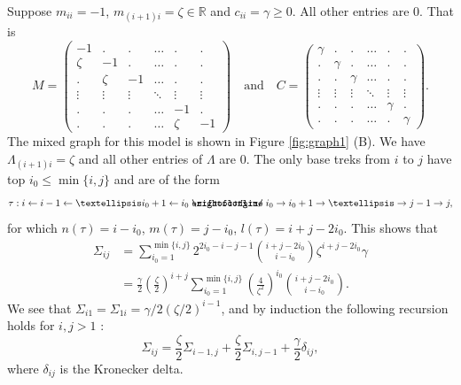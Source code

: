 \documentclass[10pt,twoside,a4paper]{amsart}
\DeclareRobustCommand{\unEdge}{%
	\mathrel{%
		\text{%
			\ooalign{$\rightfootline$\cr\reflectbox{$\rightfootline$}\cr}%
		}%
	}%
}
\begin{document}
\begin{ex} \label{ex:path}
    Suppose $m_{ii} = -1$, $m_{(i+1)i} = \zeta \in \mathbb{R}$ and $c_{ii} = \gamma \geq 0$. 
    All other entries are 0.
    That is
    \[
    M = \left( \begin{array}{ccccccc} 
        -1 & . & . & \ldots & . & . \\
        \zeta & -1 & . & \ldots & . & . \\
        . & \zeta & -1 & \ldots & . & . \\
        \vdots & \vdots & \vdots & \ddots & \vdots & \vdots \\
        . & . & . & \ldots & -1 & . \\        
        . & . & . & \ldots & \zeta & -1        
    \end{array}\right) \quad \text{and} \quad
    C = \left( \begin{array}{ccccccc} 
        \gamma & . & . & \ldots & . & . \\
        . & \gamma & . & \ldots & . & .\\
        . & . & \gamma & \ldots & . & . \\
        \vdots & \vdots & \vdots & \ddots  & \vdots & \vdots \\
        . & . & . & \ldots & \gamma & . \\
        . & . & . & \ldots & . & \gamma
    \end{array}\right).
    \]
    The mixed graph for this model is shown in Figure \ref{fig:graph1} (B).
    We have $\Lambda_{(i+1)i} = \zeta$ and all 
    other entries of $\Lambda$ are 0. The only base treks 
    from $i$ to $j$ have top $i_0 \leq \min\{i,j\}$ and are of the form
    $$\tau: i \leftarrow i - 1 \leftarrow \ldots i_0 + 1 \leftarrow i_0 
    \unEdge i_0 \rightarrow i_0 + 1 \rightarrow \ldots \rightarrow j - 1 \rightarrow j,$$
    for which $n(\tau) = i - i_0$, $m(\tau) = j - i_0$, $l(\tau) = i + j - 2i_0$.
    This shows that 
    \begin{align} 
    \Sigma_{ij} & = \sum_{i_0=1}^{\min\{i,j\}} 2^{2i_0 - i - j - 1}
     {i + j - 2i_0 \choose i - i_0} \zeta^{i + j - 2 i_0} \gamma  \nonumber \\
     & =  \frac{\gamma}{2}  \left(\frac{\zeta}{2}\right)^{i + j} 
     \sum_{i_0=1}^{\min\{i,j\}} \left(\frac{4}{\zeta^2}\right)^{i_0}
     {i + j - 2i_0 \choose i - i_0}. \label{eq:Sigmaij}
    \end{align}
    We see that 
    $\Sigma_{i1} = \Sigma_{1i} = \gamma / 2 (\zeta / 2)^{i-1}$, and by induction 
    the following recursion holds for $i,j > 1$ :
    \begin{equation} \label{eq:recursion}
        \Sigma_{ij} = \frac{\zeta}{2} \Sigma_{i-1,j} + 
        \frac{\zeta}{2}  \Sigma_{i,j-1} + \frac{\gamma}{2} \delta_{ij},
    \end{equation}
    where $\delta_{ij}$ is the Kronecker delta. 


\end{ex}
\end{document}

